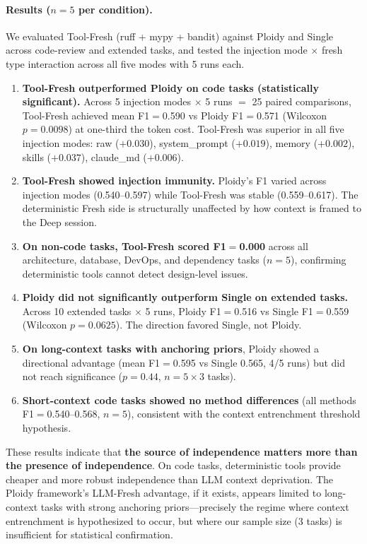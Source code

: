 \documentclass[11pt]{article}
\begin{document}
\paragraph{Results ($n{=}5$ per condition).} We evaluated Tool-Fresh (ruff + mypy + bandit) against Ploidy and Single across code-review and extended tasks, and tested the injection mode $\times$ fresh type interaction across all five modes with 5 runs each.

\begin{enumerate}[label=\arabic*., leftmargin=1.5em]
  \item \textbf{Tool-Fresh outperformed Ploidy on code tasks (statistically significant).} Across 5 injection modes $\times$ 5 runs $=$ 25 paired comparisons, Tool-Fresh achieved mean F1$=$0.590 vs Ploidy F1$=$0.571 (Wilcoxon $p{=}0.0098$) at one-third the token cost. Tool-Fresh was superior in all five injection modes: raw ($+0.030$), system\_prompt ($+0.019$), memory ($+0.002$), skills ($+0.037$), claude\_md ($+0.006$).
  \item \textbf{Tool-Fresh showed injection immunity.} Ploidy's F1 varied across injection modes (0.540--0.597) while Tool-Fresh was stable (0.559--0.617). The deterministic Fresh side is structurally unaffected by how context is framed to the Deep session.
  \item \textbf{On non-code tasks, Tool-Fresh scored F1$=$0.000} across all architecture, database, DevOps, and dependency tasks ($n{=}5$), confirming deterministic tools cannot detect design-level issues.
  \item \textbf{Ploidy did not significantly outperform Single on extended tasks.} Across 10 extended tasks $\times$ 5 runs, Ploidy F1$=$0.516 vs Single F1$=$0.559 (Wilcoxon $p{=}0.0625$). The direction favored Single, not Ploidy.
  \item \textbf{On long-context tasks with anchoring priors}, Ploidy showed a directional advantage (mean F1$=$0.595 vs Single 0.565, 4/5 runs) but did not reach significance ($p{=}0.44$, $n{=}5 \times 3$ tasks).
  \item \textbf{Short-context code tasks showed no method differences} (all methods F1$=$0.540--0.568, $n{=}5$), consistent with the context entrenchment threshold hypothesis.
\end{enumerate}

These results indicate that \textbf{the source of independence matters more than the presence of independence}. On code tasks, deterministic tools provide cheaper and more robust independence than LLM context deprivation. The Ploidy framework's LLM-Fresh advantage, if it exists, appears limited to long-context tasks with strong anchoring priors---precisely the regime where context entrenchment is hypothesized to occur, but where our sample size ($3$ tasks) is insufficient for statistical confirmation.
\end{document}
